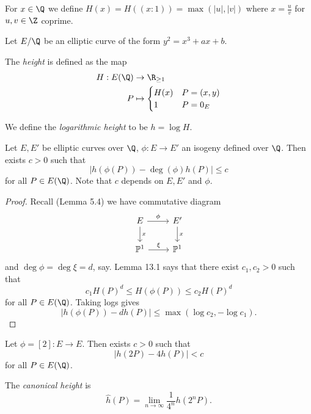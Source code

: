 \documentclass[a4paper]{article}
\theoremstyle{definition}
\renewcommand*{\P}{\mathbb{P}}
\begin{document}
\begin{notation}
  For \(x \in \Q\) we define \(H(x) = H((x: 1)) = \max(|u|, |v|)\) where \(x = \frac{u}{v}\) for \(u, v \in \Z\) coprime.
\end{notation}

Let \(E/\Q\) be an elliptic curve of the form \(y^2 = x^3 + ax + b\).

\begin{definition}[height]
  The \emph{height} is defined as the map
  \begin{align*}
    H: E(\Q) &\to \R_{\geq 1} \\
    P &\mapsto
        \begin{cases}
          H(x) & P = (x, y) \\
          1 & P = 0_E
        \end{cases}
  \end{align*}

  We define the \emph{logarithmic height} to be \(h = \log H\).
\end{definition}

\begin{lemma}
  Let \(E, E'\) be elliptic curves over \(\Q\), \(\phi: E \to E'\) an isogeny defined over \(\Q\). Then exists \(c > 0\) such that
  \[
    |h(\phi(P)) - \deg(\phi) h(P)| \leq c
  \]
  for all \(P \in E(\Q)\). Note that \(c\) depends on \(E, E'\) and \(\phi\).
\end{lemma}

\begin{proof}
  Recall (Lemma 5.4) we have commutative diagram
  \[
    \begin{tikzcd}
      E \ar[r, "\phi"] \ar[d, "x"] & E' \ar[d, "x"] \\
      \P^1 \ar[r, "\xi"] & \P^1
    \end{tikzcd}
  \]
  and \(\deg \phi = \deg \xi = d\), say. Lemma 13.1 says that there exist \(c_1, c_2 > 0\) such that
  \[
    c_1 H(P)^d \leq H(\phi(P)) \leq c_2 H(P)^d
  \]
  for all \(P \in E(\Q)\). Taking logs gives
  \[
    |h(\phi(P)) - d h(P)| \leq \max(\log c_2, -\log c_1).
  \]
\end{proof}

\begin{eg}
  Let \(\phi = [2]: E \to E\). Then exists \(c > 0\) such that
  \[
    |h(2P) - 4h(P)| < c
  \]
  for all \(P \in E(\Q)\).
\end{eg}

\begin{definition}
  The \emph{canonical height} is
  \[
    \hat h(P) = \lim_{n \to \infty} \frac{1}{4^n} h(2^nP).
  \]
\end{definition}
\end{document}
